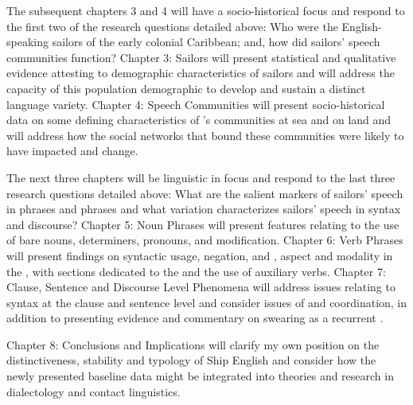 The subsequent chapters 3 and 4 will have a socio-historical focus and respond to the first two of the research questions detailed above: Who were the English-speaking sailors of the early colonial Caribbean; and, how did sailors’ speech communities function? Chapter 3: Sailors will present statistical and qualitative evidence attesting to demographic characteristics of sailors and will address the capacity of this population demographic to develop and sustain a distinct language variety. Chapter 4: Speech Communities will present socio-historical data on some defining characteristics of ’s communities at sea and on land and will address how the social networks that bound these communities were likely to have impacted  and change.  



The next three chapters will be linguistic in focus and respond to the last three research questions detailed above: What are the salient markers of sailors’ speech in  phrases and  phrases and what variation characterizes sailors’ speech in syntax and discourse? Chapter 5: Noun Phrases will present features relating to the use of bare nouns, determiners, pronouns, and  modification. Chapter 6: Verb Phrases will present findings on syntactic  usage, negation, and , aspect and modality in the , with sections dedicated to the  and the use of auxiliary verbs. Chapter 7: Clause, Sentence and Discourse Level Phenomena will address issues relating to syntax at the clause and sentence level and consider issues of  and coordination, in addition to presenting evidence and commentary on swearing as a recurrent .



Chapter 8: Conclusions and Implications will clarify my own position on the distinctiveness, stability and typology of Ship English and consider how the newly presented baseline data might be integrated into theories and research in dialectology and contact linguistics.


  
